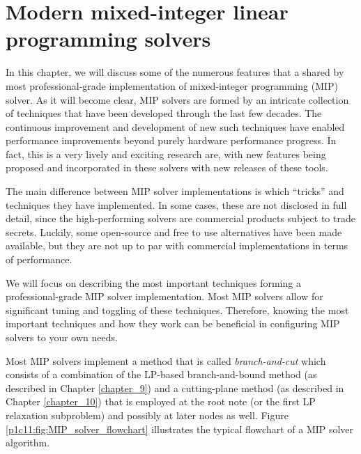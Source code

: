 \section{Modern mixed-integer linear programming solvers}

In this chapter, we will discuss some of the numerous features that a shared by most professional-grade implementation of mixed-integer programming (MIP) solver. As it will become clear, MIP solvers are formed by an intricate collection of techniques that have been developed through the last few decades. The continuous improvement and development of new such techniques have enabled performance improvements beyond purely hardware performance progress. In fact, this is a very lively and exciting research are, with new features being proposed and incorporated in these solvers with new releases of these tools.

The main difference between MIP solver implementations is which ``tricks'' and techniques they have implemented. In some cases, these are not disclosed in full detail, since the high-performing solvers are commercial products subject to trade secrets. Luckily, some open-source and free to use alternatives have been made available, but they are not up to par with commercial implementations in terms of performance.

We will focus on describing the most important techniques forming a professional-grade MIP solver implementation. Most MIP solvers allow for significant tuning and toggling of these techniques. Therefore, knowing the most important techniques and how they work can be beneficial in configuring MIP solvers to your own needs.

Most MIP solvers implement a method that is called \emph{branch-and-cut} which consists of a combination of the LP-based branch-and-bound method (as described in Chapter \ref{chapter_9}) and a cutting-plane method (as described in Chapter \ref{chapter_10}) that is employed at the root note (or the first LP relaxation subproblem) and possibly at later nodes as well. Figure \ref{p1c11:fig:MIP_solver_flowchart} illustrates the typical flowchart of a MIP solver algorithm.

